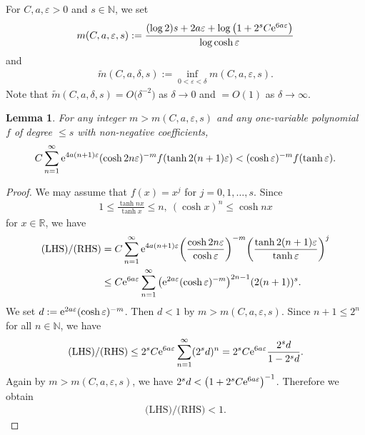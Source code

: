 \documentclass[pdftex]{sigma}
\numberwithin{equation}{section}
\newtheorem{Lemma}[Theorem]{Lemma}
\begin{document}
For $C,a,\varepsilon > 0$ and $s \in \mathbb{N}$, we set
\begin{align*}%
m(C,a,\varepsilon,s) := \frac{(\log2)s + 2a\varepsilon + \log\big(1+2^{s}C{\rm e}^{6a\varepsilon}\big)}{\log\cosh\varepsilon}
\end{align*}
and
\begin{align*}
\tilde{m}(C,a,\delta,s) :=
\inf_{0<\varepsilon<\delta}m(C,a,\varepsilon,s).
\end{align*}
Note that $\tilde{m}(C,a,\delta,s)=O\big(\delta^{-2}\big)$ as $\delta\to 0$
and $=O(1)$ as $\delta\to \infty$.
\begin{Lemma}\label{koukou}
For any integer $m > m(C,a,\varepsilon,s)$
and any one-variable polynomial $f$ of degree $\leq s$ with non-negative coefficients,
\begin{gather*}
C\sum_{n=1}^{\infty}{\rm e}^{4a(n+1)\varepsilon}(\cosh 2n\varepsilon)^{-m}f(\tanh
2(n+1)\varepsilon) < (\cosh \varepsilon)^{-m}f(\tanh \varepsilon).
\end{gather*}
\end{Lemma}
\begin{proof}
We may assume that $f(x) = x^{j}$ for $j=0,1,\ldots,s$.
Since
\begin{gather*}
1\leq \frac{\tanh nx}{\tanh x} \leq n,\
(\cosh x)^{n} \leq \cosh nx
\end{gather*}
for $x\in\mathbb{R}$, we have
\begin{align*}
\text{(LHS)/(RHS)} &=
C\sum_{n=1}^{\infty}{\rm e}^{4a(n+1)\varepsilon}\bigg(\frac{\cosh 2n
\varepsilon}{\cosh \varepsilon}\bigg)^{-m}\bigg(\frac{\tanh
2(n+1)\varepsilon}{\tanh \varepsilon}\bigg)^j \nonumber
\\
&\leq C{\rm e}^{6a\varepsilon}\sum_{n=1}^{\infty}
\big({\rm e}^{2a\varepsilon}(\cosh \varepsilon)^{-m}\big)^{2n-1}(2(n+1))^s.
\end{align*}
We set $d:={\rm e}^{2a\varepsilon}(\cosh \varepsilon)^{-m}$.
Then $d<1$ by $m>m(C,a,\varepsilon,s)$. Since $n+1\leq 2^{n}$ for all $n\in\mathbb{N}$,
we have
\begin{gather*}
\text{(LHS)/(RHS)}\leq
2^{s}C{\rm e}^{6a\varepsilon}\sum_{n=1}^{\infty} (2^{s}d)^n
= 2^{s}C{\rm e}^{6a\varepsilon}\frac{2^{s}d}{1-2^{s}d}.
\end{gather*}
Again by $m > m(C,a,\varepsilon,s)$,
we have $2^{s}d<\big(1+2^{s}C{\rm e}^{6a\varepsilon}\big)^{-1}$.
Therefore we obtain
\begin{gather*}
\text{(LHS)/(RHS)}<1.\tag*{\qed}
\end{gather*}
\renewcommand{\qed}{}
\end{proof}
\end{document}

